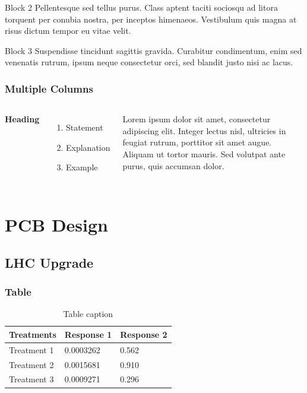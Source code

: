 \documentclass[aspectratio=43]{beamer}
\begin{document}
{\begin{frame}
\begin{block}{Block 2}
Pellentesque sed tellus purus. Class aptent taciti sociosqu ad litora torquent per conubia nostra, per inceptos himenaeos. Vestibulum quis magna at risus dictum tempor eu vitae velit.
\end{block}

\begin{block}{Block 3}
Suspendisse tincidunt sagittis gravida. Curabitur condimentum, enim sed venenatis rutrum, ipsum neque consectetur orci, sed blandit justo nisi ac lacus.
\end{block}
\end{frame}

\begin{frame}
\frametitle{Multiple Columns}
\begin{columns}[c] %

\textbf{Heading}
\begin{enumerate}
\item Statement
\item Explanation
\item Example
\end{enumerate}

Lorem ipsum dolor sit amet, consectetur adipiscing elit. Integer lectus nisl, ultricies in feugiat rutrum, porttitor sit amet augue. Aliquam ut tortor mauris. Sed volutpat ante purus, quis accumsan dolor.

\end{columns}
\end{frame}

\section{PCB Design}
\subsection{LHC Upgrade}


\begin{frame}
\frametitle{Table}
\begin{table}
\begin{tabular}{l l l}
\toprule
\textbf{Treatments} & \textbf{Response 1} & \textbf{Response 2}\\
\midrule
Treatment 1 & 0.0003262 & 0.562 \\
Treatment 2 & 0.0015681 & 0.910 \\
Treatment 3 & 0.0009271 & 0.296 \\
\bottomrule
\end{tabular}
\caption{Table caption}
\end{table}
\end{frame}

}
\end{document}
